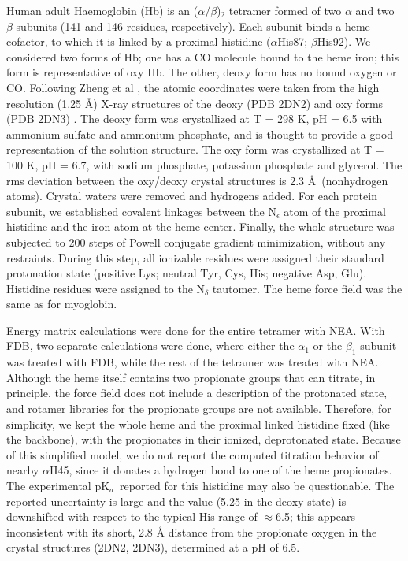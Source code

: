 \documentclass[a4paper,12pt]{article}
\newcommand{\pk}{pK$_a$}
\begin{document}
Human adult Haemoglobin (Hb) is an ($\alpha$/$\beta$)$_2$ tetramer formed of two $\alpha$ and two $\beta$
subunits (141 and 146 residues, respectively). Each subunit binds a heme cofactor, to which it is linked by a
proximal histidine ($\alpha$His87; $\beta$His92). We considered two forms of Hb; one has a CO molecule bound to
the heme iron; this form is representative of oxy Hb. The other, deoxy form has no bound oxygen or CO. Following
Zheng et al \cite{Zheng13}, the atomic coordinates were taken from the high resolution (1.25 \AA) X-ray structures
of the deoxy (PDB 2DN2) and oxy forms (PDB 2DN3) \cite{Park06}. The deoxy form was crystallized at T = 298 K, pH
= 6.5 with ammonium sulfate and ammonium phosphate, and is thought \cite{Zheng13} to provide a good representation
of the solution structure. The oxy form was crystallized at T = 100 K, pH = 6.7, with sodium phosphate, potassium
phosphate and glycerol. The rms deviation between the oxy/deoxy crystal structures is 2.3 \AA\ (nonhydrogen atoms).
Crystal waters were removed and hydrogens added. For each protein subunit, we established covalent linkages between
the N$_\epsilon$ atom of the proximal histidine and the iron atom at the heme center. Finally, the whole structure
was subjected to 200 steps of Powell conjugate gradient minimization, without any restraints. During this step, all
ionizable residues were assigned their standard protonation state (positive Lys; neutral Tyr, Cys, His; negative Asp,
Glu). Histidine residues were assigned to the N$_\delta$ tautomer. The heme force field was the same as for myoglobin.

Energy matrix calculations were done for the entire tetramer with NEA. With FDB, two separate calculations were done,
where either the $\alpha_1$ or the $\beta_1$ subunit was treated with FDB, while the rest of the tetramer was treated
with NEA. Although the heme itself contains two propionate groups that can titrate, in principle, the force field does
not include a description of the protonated state, and rotamer libraries for the propionate groups are not available.
Therefore, for simplicity, we kept the whole heme and the proximal linked histidine fixed (like the backbone), with
the propionates in their ionized, deprotonated state. Because of this simplified model, we do not report the
computed titration behavior of nearby $\alpha$H45, since it donates a hydrogen bond to one of the heme propionates.
The experimental \pk\ reported for this histidine \cite{Ho10} may also be questionable. The reported uncertainty is
large \cite{Zheng13} and the value (5.25 in the deoxy state) is downshifted with respect to the typical His range of
$\approx$6.5; this appears inconsistent with its short, 2.8 {\AA} distance from the propionate oxygen in the crystal
structures (2DN2, 2DN3), determined at a pH of 6.5.
\end{document}
